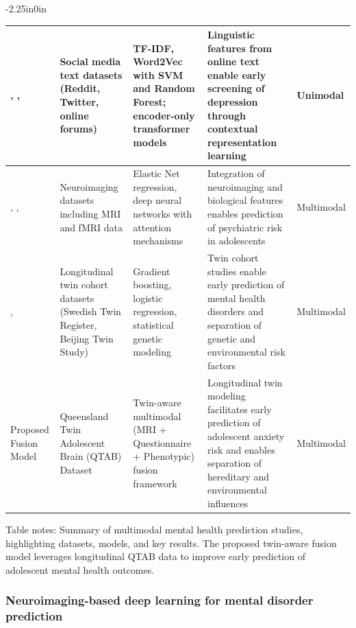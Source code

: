 \documentclass[10pt,letterpaper]{article}
\begin{document}
\begin{table}[!t]
\begin{adjustwidth}{-2.25in}{0in}
\begin{tabular}{|p{2.0cm}|p{3.5cm}|p{3.8cm}|p{4.8cm}|p{1.8cm}|}
\cite{ref11}, \cite{ref13}, \cite{ref17}
& Social media text datasets (Reddit, Twitter, online forums)
& TF-IDF, Word2Vec with SVM and Random Forest; encoder-only transformer models
& Linguistic features from online text enable early screening of depression through contextual representation learning
& Unimodal \\
\hline

\cite{ref23}, \cite{ref25}, \cite{ref46}
& Neuroimaging datasets including MRI and fMRI data
& Elastic Net regression, deep neural networks with attention mechanisms
& Integration of neuroimaging and biological features enables prediction of psychiatric risk in adolescents
& Multimodal \\
\hline

\cite{ref33}, \cite{ref34}
& Longitudinal twin cohort datasets (Swedish Twin Register, Beijing Twin Study)
& Gradient boosting, logistic regression, statistical genetic modeling
& Twin cohort studies enable early prediction of mental health disorders and separation of genetic and environmental risk factors
& Multimodal \\
\hline

Proposed Fusion Model
& Queensland Twin Adolescent Brain (QTAB) Dataset~\cite{ref31,ref32}
& Twin-aware multimodal (MRI + Questionnaire + Phenotypic) fusion framework
& Longitudinal twin modeling facilitates early prediction of adolescent anxiety risk and enables separation of hereditary and environmental influences
& Multimodal \\
\hline

\end{tabular}

\begin{flushleft}
Table notes: Summary of multimodal mental health prediction studies, highlighting datasets, models, and key results. The proposed twin-aware fusion model leverages longitudinal QTAB data to improve early prediction of adolescent mental health outcomes.
\end{flushleft}

\end{adjustwidth}
\end{table}

\subsubsection*{Neuroimaging-based deep learning for mental disorder prediction}
\end{document}
